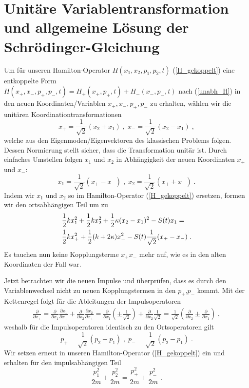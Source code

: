 \section{Unitäre Variablentransformation und allgemeine Lösung der Schrödinger-Gleichung}
  Um für unseren Hamilton-Operator $H(x_1,x_2,p_1,p_2,t)$ (\ref{H_gekoppelt}) eine entkoppelte Form \\
  $H(x_+,x_-,p_+,p_-,t)=H_+(x_+,p_+,t)+H_-(x_-,p_-,t)$ nach (\ref{unabh_H}) in den neuen Koordinaten/Variablen $x_+,x_-,p_+,p_-$ zu erhalten, wählen wir die unitären Koordinationtransformationen \cite{arxiv}
  \begin{equation}
    x_+ = \frac{1}{\sqrt{2}}(x_2+x_1) \;,\; x_-=\frac{1}{\sqrt{2}}(x_2-x_1) \;,
    \label{koord_trafo_x}
  \end{equation}
  welche aus den Eigenmoden/Eigenvektoren des klassischen Problems folgen.
  Dessen Normierung stellt sicher, dass die Transformation unitär ist.
  Durch einfaches Umstellen folgen $x_1$ und $x_2$ in Abhängigkeit der neuen Koordinaten $x_+$ und $x_-$:
  \begin{equation}
    x_1=\frac{1}{\sqrt{2}}(x_+-x_-) \;,\; x_2=\frac{1}{\sqrt{2}}(x_++x_-) \; .
  \end{equation}
  Indem wir $x_1$ und $x_2$ so im Hamilton-Operator (\ref{H_gekoppelt}) ersetzen, formen wir den ortsabhängigen Teil um zu
  \begin{align}
    &\frac{1}{2}kx_1^2+\frac{1}{2}kx_2^2+\frac{1}{2}\kappa(x_2-x_1)^2-S(t)x_1= \notag\\
    &\frac{1}{2}kx_+^2+\frac{1}{2}(k+2\kappa)x_-^2-S(t)\frac{1}{\sqrt{2}}(x_+-x_-) \; .
  \end{align}
  Es tauchen nun keine Kopplungsterme $x_+x_-$ mehr auf, wie es in den alten Koordinaten der Fall war.

  Jetzt betrachten wir die neuen Impulse und überprüfen, dass es durch den Variablenwechsel nicht zu neuen Kopplungstermen in den $p_+$,$p_-$ kommt.
  Mit der Kettenregel folgt für die Ableitungen der Impulsoperatoren
  \begin{align}
    \frac{\partial}{\partial x_{\pm}} = \frac{\partial}{\partial x_1}\frac{\partial x_1}{\partial x_{\pm}} + \frac{\partial}{\partial x_2}\frac{\partial x_2}{\partial x_{\pm}}
    =\frac{\partial}{\partial x_1}\left(\pm\frac{1}{\sqrt{2}}\right)
    + \frac{\partial}{\partial x_2}\frac{1}{\sqrt{2}}
    = \frac{1}{\sqrt{2}}\left(\frac{\partial}{\partial x_2}\pm\frac{\partial}{\partial  x_1}\right) \;,
  \end{align}
  weshalb für die Impulsoperatoren identisch zu den Ortsoperatoren gilt
  \begin{equation}
    p_+ = \frac{1}{\sqrt{2}}(p_2+p_1) \;,\; p_-=\frac{1}{\sqrt{2}}(p_2-p_1) \; .
    \label{koord_trafo_p}
  \end{equation}
  Wir setzen erneut in unseren Hamilton-Operator (\ref{H_gekoppelt}) ein und erhalten für den impulsabhängigen Teil
  \begin{equation}
    \frac{p_1^2}{2m} + \frac{p_2^2}{2m} = \frac{p_+^2}{2m} + \frac{p_-^2}{2m} \; .
    \label{koord_trafo_p^2}
  \end{equation}

